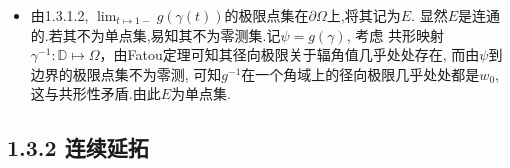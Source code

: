 \begin{itemize}
事实上连续延拓后的$\varphi : \overline{\mathbb{D}}\to \overline{\mathbb{D}}$, 
经由反射原理可进一步延拓为 $\mathbb{C}_{\infty}$上的自同构, 
而复球面上自同构由其在三个不同点上的取值唯一确定,由此证明命题.


    \item[1.3.1.5]

由1.3.1.2, $\lim_{t\mapsto 1-}g(\gamma(t))$的极限点集在$\partial \Omega$上,将其记为$E$.
显然$E$是连通的.若其不为单点集,易知其不为零测集.记$\psi = g(\gamma)$, 考虑
共形映射$\gamma^{-1}:\mathbb{D}\mapsto\Omega$，由Fatou定理可知其径向极限关于辐角值几乎处处存在,
而由$\psi$到边界的极限点集不为零测, 可知$g^{-1}$在一个角域上的径向极限几乎处处都是$w_0$,这与共形性矛盾.由此$E$为单点集. 
\end{itemize}

\subsection*{1.3.2 连续延拓}

